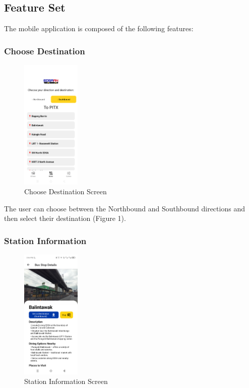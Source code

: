 \documentclass{icsthesis}
\begin{document}
\begin{mainmatter}
\begin{enumerate}
 \end{enumerate}

\subsection{Feature Set}
The mobile application is composed of the following features:
\newline

\subsubsection{\textbf{Choose Destination}}

\begin{figure}[htbp]
  \centering
  \includegraphics[width=0.25\textwidth]{Texfiles/screenshots/EDSAan_browse.png}
  \caption{Choose Destination Screen}
  \label{fig:yourlabel}
\end{figure}

The user can choose between the Northbound and Southbound directions and then select their destination (Figure 1).

\subsubsection{\textbf{Station Information}}

\begin{figure}[htbp]
  \centering
  \includegraphics[width=0.25\textwidth]{Texfiles/screenshots/EDSAan_stationinfo.png}
  \caption{Station Information Screen}
  \label{fig:yourlabel}
\end{figure}


\end{mainmatter}
\end{document}
